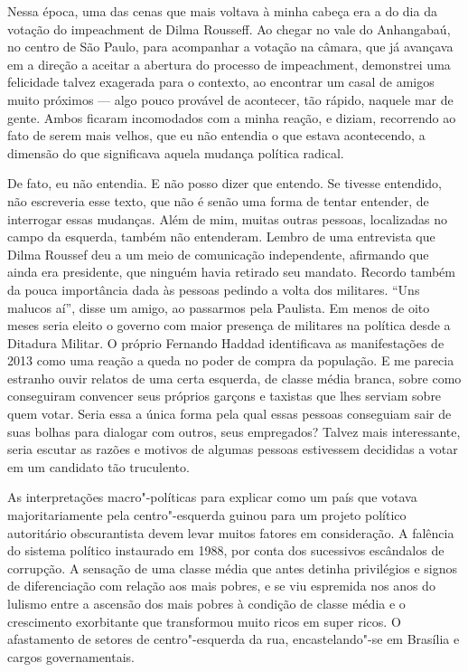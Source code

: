 Nessa época, uma das cenas que mais voltava à minha cabeça era a do dia
da votação do impeachment de Dilma Rousseff. Ao chegar no vale do
Anhangabaú, no centro de São Paulo, para acompanhar a votação na câmara,
que já avançava em a direção a aceitar a abertura do processo de
impeachment, demonstrei uma felicidade talvez exagerada para o contexto,
ao encontrar um casal de amigos muito próximos --- algo pouco provável de
acontecer, tão rápido, naquele mar de gente. Ambos ficaram incomodados
com a minha reação, e diziam, recorrendo ao fato de serem mais velhos,
que eu não entendia o que estava acontecendo, a dimensão do que
significava aquela mudança política radical.

De fato, eu não entendia. E não posso dizer que entendo. Se tivesse
entendido, não escreveria esse texto, que não é senão uma forma de
tentar entender, de interrogar essas mudanças. Além de mim, muitas
outras pessoas, localizadas no campo da esquerda, também não entenderam.
Lembro de uma entrevista que Dilma Roussef deu a um meio de comunicação
independente, afirmando que ainda era presidente, que ninguém havia
retirado seu mandato. Recordo também da pouca importância dada às
pessoas pedindo a volta dos militares. ``Uns malucos aí'', disse um
amigo, ao passarmos pela Paulista. Em menos de oito meses seria eleito o
governo com maior presença de militares na política desde a Ditadura
Militar. O próprio Fernando Haddad identificava as manifestações de 2013
como uma reação a queda no poder de compra da população. E me parecia
estranho ouvir relatos de uma certa esquerda, de classe média branca,
sobre como conseguiram convencer seus próprios garçons e taxistas que
lhes serviam sobre quem votar. Seria essa a única forma pela qual essas
pessoas conseguiam sair de suas bolhas para dialogar com outros, seus
empregados? Talvez mais interessante, seria escutar as razões e motivos
de algumas pessoas estivessem decididas a votar em um candidato tão
truculento.

As interpretações macro"-políticas para explicar como um país que votava
majoritariamente pela centro"-esquerda guinou para um projeto político
autoritário obscurantista devem levar muitos fatores em consideração. A
falência do sistema político instaurado em 1988, por conta dos
sucessivos escândalos de corrupção. A sensação de uma classe média que
antes detinha privilégios e signos de diferenciação com relação aos mais
pobres, e se viu espremida nos anos do lulismo entre a ascensão dos mais
pobres à condição de classe média e o crescimento exorbitante que
transformou muito ricos em super ricos. O afastamento de setores de
centro"-esquerda da rua, encastelando"-se em Brasília e cargos
governamentais.


